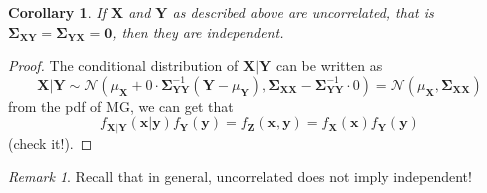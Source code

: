 \documentclass{article}
\newtheorem{corollary}{Corollary}
\DeclareMathOperator*{\1}{\mathbbm{1}}
\renewcommand{\b}[1]{\mathbf{#1}}
\newcommand{\cN}{\mathcal{N}}
\theoremstyle{definition}
\theoremstyle{remark}
\newtheorem{remark}{Remark}
\newcommand{\bSig}{\mathbf{\Sigma}}
\begin{document}
  \begin{corollary}
    If $\b X$ and $\b Y$ as described above are uncorrelated, that is $\bSig_{\b X\b Y}=\bSig_{\b Y\b X}=\b 0$, then they are independent.
  \end{corollary}
  \begin{proof}
    The conditional distribution of $\b X\vert \b Y$ can be written as
    \[\b X|\b Y\sim \cN(\mu_{\b X}+0\cdot \bSig_{\b Y\b Y}^{-1}(\b Y-\mu_{\b Y}), \bSig_{\b X\b X}-\bSig_{\b Y\b Y}^{-1} \cdot 0)=\cN(\mu_{\b X}, \bSig_{\b X\b X})\]
    from the pdf of MG, we can get that \[f_{\b X\vert \b Y}(\b x\vert\b y)f_{\b Y}(\b y)=f_{\b Z}(\b x,\b y)=f_{\b X}(\b x)f_{\b Y}(\b y)\](check it!). 
  \end{proof}
  \begin{remark}
    Recall that in general, uncorrelated does not imply independent!
  \end{remark}
  
\end{document}
